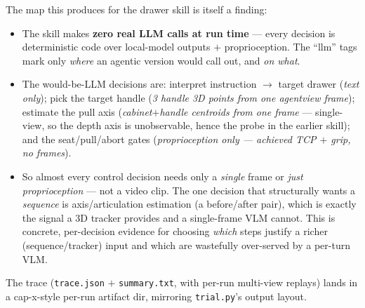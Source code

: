 \documentclass[11pt]{article}
\newcommand{\code}[1]{\texttt{#1}}
\begin{document}
The map this produces for the drawer skill is itself a finding:
\begin{itemize}
  \item The skill makes \textbf{zero real LLM calls at run time} --- every decision is
        deterministic code over local-model outputs $+$ proprioception. The ``llm'' tags
        mark only \emph{where} an agentic version would call out, and \emph{on what}.
  \item The would-be-LLM decisions are: interpret instruction $\to$ target drawer
        (\emph{text only}); pick the target handle (\emph{3 handle 3D points from one
        agentview frame}); estimate the pull axis (\emph{cabinet$+$handle centroids from
        one frame} --- single-view, so the depth axis is unobservable, hence the probe in
        the earlier skill); and the seat/pull/abort gates (\emph{proprioception only ---
        achieved TCP $+$ grip, no frames}).
  \item So almost every control decision needs only a \emph{single} frame or \emph{just
        proprioception} --- not a video clip. The one decision that structurally wants a
        \emph{sequence} is axis/articulation estimation (a before/after pair), which is
        exactly the signal a 3D tracker provides and a single-frame VLM cannot. This is
        concrete, per-decision evidence for choosing \emph{which} steps justify a richer
        (sequence/tracker) input and which are wastefully over-served by a per-turn VLM.
\end{itemize}
The trace (\code{trace.json} $+$ \code{summary.txt}, with per-run multi-view replays)
lands in a cap-x-style per-run artifact dir, mirroring \code{trial.py}'s output layout.
\end{document}
